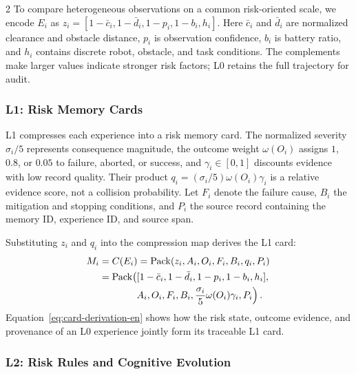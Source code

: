 \documentclass[10pt]{article}
\begin{document}
\begin{multicols}{2}
To compare heterogeneous observations on a common risk-oriented scale, we encode $E_i$ as $z_i=[1-\bar c_i,1-\bar d_i,1-p_i,1-b_i,h_i]$. Here $\bar c_i$ and $\bar d_i$ are normalized clearance and obstacle distance, $p_i$ is observation confidence, $b_i$ is battery ratio, and $h_i$ contains discrete robot, obstacle, and task conditions. The complements make larger values indicate stronger risk factors; L0 retains the full trajectory for audit.

\subsubsection{L1: Risk Memory Cards}

L1 compresses each experience into a risk memory card. The normalized severity $\sigma_i/5$ represents consequence magnitude, the outcome weight $\omega(O_i)$ assigns $1$, $0.8$, or $0.05$ to failure, aborted, or success, and $\gamma_i\in[0,1]$ discounts evidence with low record quality. Their product $q_i=(\sigma_i/5)\omega(O_i)\gamma_i$ is a relative evidence score, not a collision probability. Let $F_i$ denote the failure cause, $B_i$ the mitigation and stopping conditions, and $P_i$ the source record containing the memory ID, experience ID, and source span.

Substituting $z_i$ and $q_i$ into the compression map derives the L1 card:
\begin{equation}
\begin{aligned}
M_i&=C(E_i)=\operatorname{Pack}(z_i,A_i,O_i,F_i,B_i,q_i,P_i)\\
&=\operatorname{Pack}\!\left([1-\bar c_i,1-\bar d_i,1-p_i,1-b_i,h_i],\right.\\
&\hspace{3.6em}\left.A_i,O_i,F_i,B_i,
\frac{\sigma_i}{5}\omega(O_i)\gamma_i,P_i\right).
\end{aligned}
\label{eq:card-derivation-en}
\end{equation}
Equation~\eqref{eq:card-derivation-en} shows how the risk state, outcome evidence, and provenance of an L0 experience jointly form its traceable L1 card.

\subsubsection{L2: Risk Rules and Cognitive Evolution}


\end{multicols}
\end{document}
